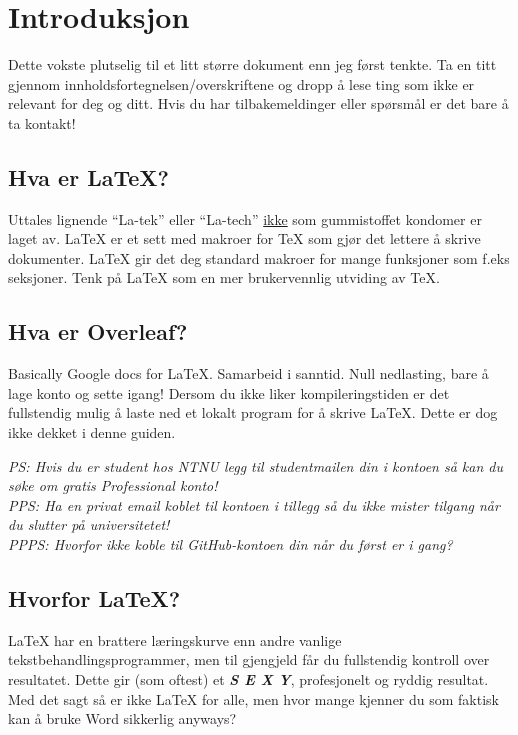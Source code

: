 \section{Introduksjon}
    Dette vokste plutselig til et litt større dokument enn jeg først tenkte. Ta en titt gjennom innholdsfortegnelsen/overskriftene og dropp å lese ting som ikke er relevant for deg og ditt.
    Hvis du har tilbakemeldinger eller spørsmål er det bare å ta kontakt!
    
    \subsection{Hva er \LaTeX?}
        Uttales lignende ``La-tek'' eller ``La-tech'' \underline{ikke} som gummistoffet kondomer er laget av. 
        \LaTeX{} er et sett med makroer for \TeX{} som gjør det lettere å skrive dokumenter. \LaTeX{} gir det deg standard makroer for mange funksjoner som f.eks seksjoner. Tenk på  \LaTeX{} som en mer brukervennlig utviding av \TeX.
    
    \subsection{Hva er Overleaf?}
        Basically Google docs for \LaTeX. Samarbeid i sanntid. Null nedlasting, bare å lage konto og sette igang! 
        Dersom du ikke liker kompileringstiden er det fullstendig mulig å laste ned et lokalt program for å skrive \LaTeX.
        Dette er dog ikke dekket i denne guiden.
        
        \textit{PS: Hvis du er student hos NTNU legg til studentmailen din i kontoen så kan du søke om gratis Professional konto!\\
        PPS: Ha en privat email koblet til kontoen i tillegg så du ikke mister tilgang når du slutter på universitetet!\\
        PPPS: Hvorfor ikke koble til GitHub-kontoen din når du først er i gang?}
    
    \subsection{Hvorfor \LaTeX?}
        \LaTeX{} har en brattere læringskurve enn andre vanlige tekstbehandlingsprogrammer, men til gjengjeld får du fullstendig kontroll over resultatet. Dette gir (som oftest) et \textit{\textbf{S E  X Y}}, profesjonelt og ryddig resultat. Med det sagt så er ikke \LaTeX{} for alle, men hvor mange kjenner du som faktisk kan å bruke Word sikkerlig anyways?
        
